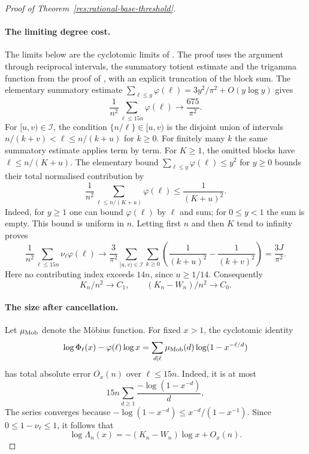 \documentclass[11pt]{article}
\begin{document}
\begin{proof}[Proof of Theorem~\ref{res:rational-base-threshold}]
\paragraph{The limiting degree cost.}
The limits below are the cyclotomic limits of
\cite[Lemmas~1--2, p.~155]{zudilin2004}.  The proof uses the argument through
reciprocal intervals, the summatory totient estimate and the trigamma function
from the proof of \cite[Lemma~1, p.~466]{zudilin2002}, with an explicit
truncation of the block sum.
The elementary summatory estimate
$\sum_{\ell\le y}\varphi(\ell)=3y^2/\pi^2+O(y\log y)$ gives
\[
 \frac1{n^2}\sum_{\ell\le15n}\varphi(\ell)\longrightarrow\frac{675}{\pi^2}.
\]
For $[u,v)\in\mathcal I$, the condition $\{n/\ell\}\in[u,v)$ is the
disjoint union of intervals
$n/(k+v)<\ell\le n/(k+u)$ for $k\ge0$.
For finitely many $k$ the same summatory estimate applies term by term.
For $K\ge1$, the omitted blocks have $\ell\le n/(K+u)$. The elementary
bound $\sum_{\ell\le y}\varphi(\ell)\le y^2$ for $y\ge0$ bounds their
total normalised contribution by
\[
 \frac1{n^2}\sum_{\ell\le n/(K+u)}\varphi(\ell)
 \le\frac1{(K+u)^2}.
\]
Indeed, for $y\ge1$ one can bound $\varphi(\ell)$ by $\ell$ and sum;
for $0\le y<1$ the sum is empty. This bound is uniform in $n$.
Letting first $n$ and then $K$ tend to infinity proves
\[
 \frac1{n^2}\sum_{\ell\le15n}\nu_\ell\varphi(\ell)
 \longrightarrow\frac3{\pi^2}
 \sum_{[u,v)\in\mathcal I}\sum_{k\ge0}
 \left(\frac1{(k+u)^2}-\frac1{(k+v)^2}\right)=\frac{3J}{\pi^2}.
\]
Here no contributing index exceeds $14n$, since $u\ge1/14$.
Consequently
\[
 K_n/n^2\longrightarrow C_1,\qquad
 (K_n-W_n)/n^2\longrightarrow C_0.
\]

\paragraph{The size after cancellation.}
Let $\mu_{\rm Mob}$ denote the M\"obius function. For fixed $x>1$,
the cyclotomic identity
\[
 \log\Phi_\ell(x)-\varphi(\ell)\log x
 =\sum_{d\mid\ell}\mu_{\rm Mob}(d)\log(1-x^{-\ell/d})
\]
has total absolute error $O_x(n)$ over $\ell\le15n$.
Indeed, it is at most
\[
 15n\sum_{d\ge1}\frac{-\log(1-x^{-d})}{d},
\]
The series converges because
$-\log(1-x^{-d})\le x^{-d}/(1-x^{-1})$.
Since $0\le1-\nu_\ell\le1$, it follows that
\[
 \log\Lambda_n(x)=-(K_n-W_n)\log x+O_x(n).
\]


\end{proof}
\end{document}
